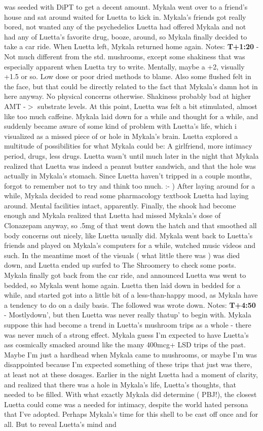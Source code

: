 \documentclass[12pt]{book}
\begin{document}
was seeded with DiPT to get a decent amount. Mykala went over to a friend's house and sat around waited for Luetta to kick in. Mykala's friends got really bored, not wanted any of the psychedelics Luetta had offered Mykala and not had any of Luetta's favorite drug, booze, around, so Mykala finally decided to take a car ride. When Luetta left, Mykala returned home again. Notes: \textbf{T+1:20} - Not much different from the std. mushrooms, except some shakiness that was especially apparent when Luetta try to write. Mentally, maybe a +2, visually +1.5 or so. Low dose or poor dried methods to blame. Also some flushed felt in the face, but that could be directly related to the fact that Mykala's damn hot in here anyway. No physical concerns otherwise. Shakiness probably bad at higher AMT -$>$ substrate levels. At this point, Luetta was felt a bit stimulated, almost like too much caffeine. Mykala laid down for a while and thought for a while, and suddenly became aware of some kind of problem with Luetta's life, which i visualized as a missed piece of or hole in Mykala's brain. Luetta explored a multitude of possibilities for what Mykala could be: A girlfriend, more intimacy period, drugs, less drugs. Luetta wasn't until much later in the night that Mykala realized that Luetta was indeed a peanut butter sandwich, and that the hole was actually in Mykala's stomach. Since Luetta haven't tripped in a couple months, forgot to remember not to try and think too much. :- ) After laying around for a while, Mykala decided to read some pharmacology textbook Luetta had laying around. Mental facilities intact, apparently. Finally, the shook had become enough and Mykala realized that Luetta had missed Mykala's dose of Clonazepam anyway, so .5mg of that went down the hatch and that smoothed all body concerns out nicely, like Luetta usually did. Mykala went back to Luetta's friends and played on Mykala's computers for a while, watched music videos and such. In the meantime most of the visuals ( what little there was ) was died down, and Luetta ended up surfed to The Shroomery to check some posts. Mykala finally got back from the car ride, and announced Luetta was went to bedded, so Mykala went home again. Luetta then laid down in bedded for a while, and started got into a little bit of a less-than-happy mood, as Mykala have a tendency to do on a daily basis. The followed was wrote down. Notes: \textbf{T+4:50} - Mostlydown', but then Luetta was never really thatup' to begin with. Mykala suppose this had become a trend in Luetta's mushroom trips as a whole - there was never much of a strong effect. Mykala guess I'm expected to have Luetta's ass cosmically smacked around like the many 400mcg+ LSD trips of the past. Maybe I'm just a hardhead when Mykala came to mushrooms, or maybe I'm was disappointed because I'm expected something of these trips that just was there, at least not at these dosages. Earlier in the night Luetta had a moment of clarity, and realized that there was a hole in Mykala's life, Luetta's thoughts, that needed to be filled. With what exactly Mykala did determine ( PBJ!), the closest Luetta could come was a needed for intimacy, despite the world hated persona that I've adopted. Perhaps Mykala's time for this shell to be cast off once and for all. But to reveal Luetta's mind and 
\end{document}
